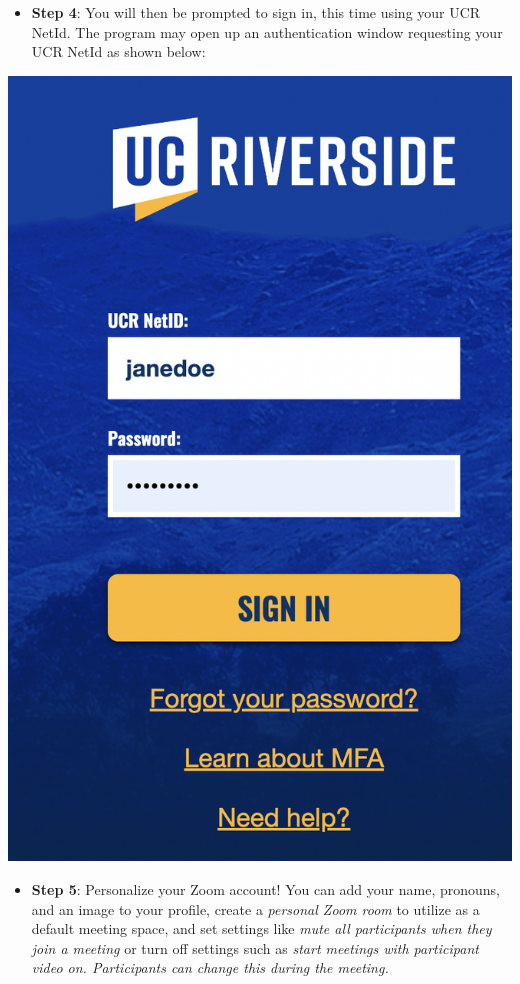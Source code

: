\documentclass[
]{book}
\providecommand{\tightlist}{%
  \setlength{\itemsep}{0pt}\setlength{\parskip}{0pt}}
\begin{document}
\begin{itemize}
\tightlist
\item
  \textbf{Step 4}: You will then be prompted to sign in, this time using your UCR NetId. The program may open up an authentication window requesting your UCR NetId as shown below:
\end{itemize}

\begin{center}\includegraphics{images/zoomcred} \end{center}

\begin{itemize}
\tightlist
\item
  \textbf{Step 5}: Personalize your Zoom account! You can add your name, pronouns, and an image to your profile, create a \emph{personal Zoom room} to utilize as a default meeting space, and set settings like \emph{mute all participants when they join a meeting} or turn off settings such as \emph{start meetings with participant video on. Participants can change this during the meeting.}
\end{itemize}
\end{document}
